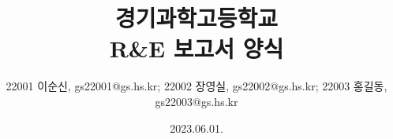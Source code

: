 \title{경기과학고등학교\\ R\&E 보고서 양식}
\author{22001 이순신, gs22001@gs.hs.kr; 22002 장영실, gs22002@gs.hs.kr; 22003 홍길동, gs22003@gs.hs.kr}
\date{2023.06.01.}

